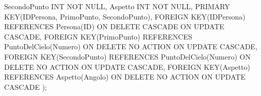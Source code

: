 \null\qquad SecondoPunto INT NOT NULL,\newline
\null\qquad Aspetto INT NOT NULL,\newline
\null\qquad PRIMARY KEY(IDPersona, PrimoPunto, SecondoPunto),\newline
\null\qquad FOREIGN KEY(IDPersona) REFERENCES Persona(ID)\newline
\null\qquad ON DELETE CASCADE\newline
\null\qquad ON UPDATE CASCADE,\newline
\null\qquad FOREIGN KEY(PrimoPunto) REFERENCES PuntoDelCielo(Numero)\newline
\null\qquad ON DELETE NO ACTION\newline
\null\qquad ON UPDATE CASCADE,\newline
\null\qquad FOREIGN KEY(SecondoPunto) REFERENCES PuntoDelCielo(Numero)\newline
\null\qquad ON DELETE NO ACTION\newline
\null\qquad ON UPDATE CASCADE,\newline
\null\qquad FOREIGN KEY(Aspetto) REFERENCES Aspetto(Angolo)\newline
\null\qquad ON DELETE NO ACTION\newline
\null\qquad ON UPDATE CASCADE\newline
);\newline

